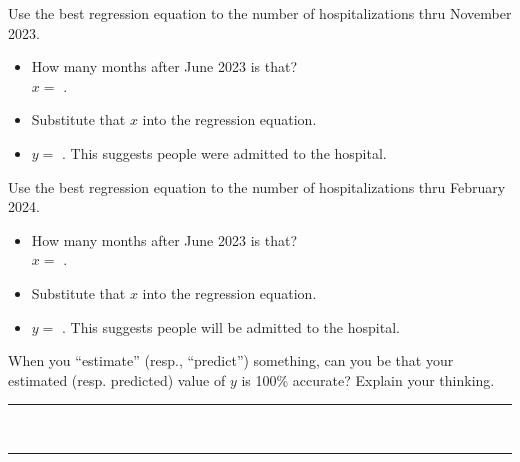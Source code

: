 \begin{minipage}{0.45\textwidth}
    \noindent 
    Use the best regression equation to  
    the number of hospitalizations  thru November 2023.
    \begin{itemize}[fullwidth,nosep]
        \item How many months after June 2023 is that?\\ $x =$ .
        \item Substitute that $x$ into the regression equation.
        \item $y =$ . 
        This suggests  people were admitted to the hospital.
    \end{itemize}
\end{minipage}
\hfill
\begin{minipage}{0.45\textwidth}
    \noindent 
    Use the best regression equation to  
    the number of hospitalizations  thru February 2024.
    \begin{itemize}[fullwidth,nosep]
        \item How many months after June 2023 is that?\\ $x =$ .
        \item Substitute that $x$ into the regression equation.
        \item $y =$ . 
        This suggests  people will be admitted to the hospital.
    \end{itemize}
\end{minipage}

\vspace{1\onelineskip}

\noindent 
When you ``estimate'' (resp., ``predict'') something, 
can you be  that your estimated (resp. predicted) 
value of $y$ is 100\% accurate?
Explain your thinking.\\[0.65\onelineskip]

\noindent\rule[\onelineskip]{\textwidth}{0.4pt}\\[0.65\onelineskip]
\noindent\rule[\onelineskip]{\textwidth}{0.4pt}